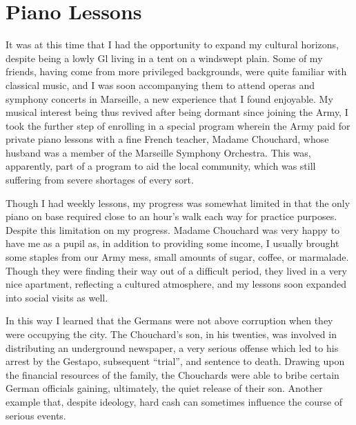 \documentclass[../m3y]{subfiles}
\begin{document}
\section{Piano Lessons}
It was at this time that I had the opportunity to expand my cultural horizons, despite being a lowly Gl living in a tent on a windswept plain. Some of my friends, having come from more privileged backgrounds, were quite familiar with classical music, and I was soon accompanying them to attend operas and symphony concerts in Marseille, a new experience that I found enjoyable. My musical interest being thus revived after being dormant since joining the Army, I took the further step of enrolling in a special program wherein the Army paid for private piano lessons with a fine French teacher, Madame Chouchard, whose husband was a member of the Marseille Symphony Orchestra. This was, apparently, part of a program to aid the local community, which was still suffering from severe shortages of every sort.

Though I had weekly lessons, my progress was somewhat limited in that the only piano on base required close to an hour's walk each way for practice purposes. Despite this limitation on my progress. Madame Chouchard was very happy to have me as a pupil as, in addition to providing some income, I usually brought some staples from our Army mess, small amounts of sugar, coffee, or marmalade. Though they were finding their way out of a difficult period, they lived in a very nice apartment, reflecting a cultured atmosphere, and my lessons soon expanded into social visits as well.

In this way I learned that the Germans were not above corruption when they were occupying the city. The Chouchard's son, in his twenties, was involved in distributing an underground newspaper, a very serious offense which led to his arrest by the Gestapo, subsequent ``trial'', and sentence to death. Drawing upon the financial resources of the family, the Chouchards were able to bribe certain German officials gaining, ultimately, the quiet release of their son. Another example that, despite ideology, hard cash can sometimes influence the course of serious events.
\end{document}

